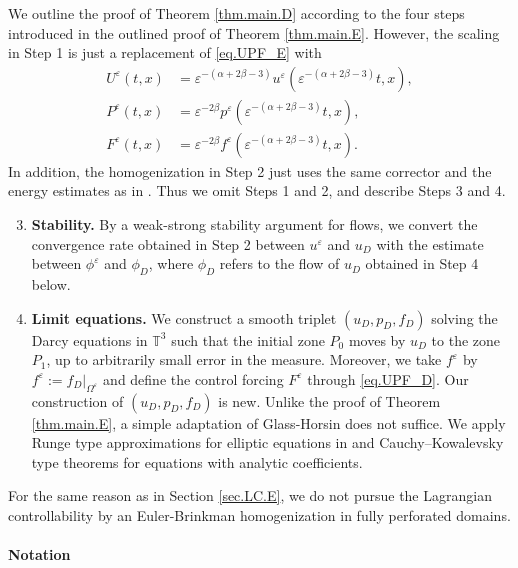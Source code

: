 \documentclass[11pt,a4paper]{article}
\numberwithin{equation}{section}
\newcommand{\T}{\mathbb{T}}
\newcommand{\eps}{\varepsilon}
\begin{document}
We outline the proof of Theorem \ref{thm.main.D} according to the four steps introduced in the outlined proof of Theorem \ref{thm.main.E}. However, the scaling in Step 1 is just a replacement of \eqref{eq.UPF_E} with 
\begin{equation}\label{eq.UPF_D}
\begin{split}
    U^\eps(t,x) 
    &= \eps^{-(\alpha+2\beta-3)} u^\eps(\eps^{-(\alpha+2\beta-3)}t,x), \\
    P^\eps(t,x) 
    &= \eps^{-2\beta} p^\eps(\eps^{-(\alpha+2\beta-3)}t,x), \\
    F^\eps(t,x) 
    &= \eps^{-2\beta} f^\eps(\eps^{-(\alpha+2\beta-3)}t,x). 
\end{split}
\end{equation}
In addition, the homogenization in Step 2 just uses the same corrector and the energy estimates as in \cite{Hof23}. Thus we omit Steps 1 and 2, and describe Steps 3 and 4. 
\begin{enumerate}[Step 1.]
\setcounter{enumi}{2}
\item 
\textbf{Stability.} 
By a weak-strong stability argument for flows, we convert the convergence rate obtained in Step 2 between $u^\eps$ and $u_D$  with the estimate between $\phi^\eps$ and $\phi_D$, where $\phi_D$ refers to the flow of $u_D$ obtained in Step 4 below. 


\item
\textbf{Limit equations.} 
We construct a smooth triplet $(u_D, p_D, f_D)$ solving the Darcy equations in $\T^3$ such that the initial zone $P_0$ moves by $u_D$ to the zone $P_1$, up to arbitrarily small error in the measure. Moreover, we take $f^{\eps}$ by $f^\eps := f_D|_{\Omega^\eps}$ and define the control forcing $F^\eps$ through \eqref{eq.UPF_D}. Our construction of $(u_D, p_D, f_D)$ is new. Unlike the proof of Theorem \ref{thm.main.E}, a simple adaptation of Glass-Horsin \cite{GlaHor12} does not suffice. We apply Runge type approximations for elliptic equations in \cite{Bro61} and Cauchy–Kowalevsky type theorems for equations with analytic coefficients.
\end{enumerate}


For the same reason as in Section \ref{sec.LC.E}, we do not pursue the Lagrangian controllability by an Euler-Brinkman homogenization in fully perforated domains. 


    \paragraph{Notation}
\end{document}
